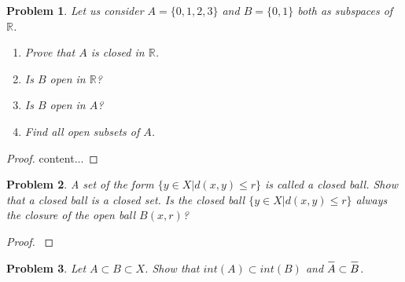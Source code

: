 \documentclass[paper=a4, fontsize=11pt]{scrartcl}
\newcommand{\overbar}[1]{
	\mkern 1.5mu \overline{\mkern-1.5mu\raisebox{0pt}[\dimexpr\height+0.5mm\relax]{$#1$}\mkern-1.5mu}\mkern 1.5mu
}
\newtheorem{problem}{Problem}
\begin{document}
\begin{problem}
	Let us consider $A=\{0,1,2,3\}$ and $B=\{0,1\}$ both as subspaces of $\mathbb{R}$.
	\begin{enumerate}[label=(\alph*)]
		\item Prove that $A$ is closed in $\mathbb{R}$.
		\item Is $B$ open in $\mathbb{R}$?
		\item Is $B$ open in $A$?
		\item Find all open subsets of $A$.\\
	\end{enumerate}
\end{problem}

\begin{proof}
	content...
\end{proof}

\begin{problem}
	A set of the form $\{y \in X | d(x,y) \leq r \}$ is called a closed ball. Show that a closed ball is a closed set. Is the closed ball $\{ y \in X | d(x,y) \leq r \}$ always the closure of the open ball $B(x,r)$?\\
\end{problem}

\begin{proof}
	$ $ \newline
	\vspace{-0.15in}
\end{proof}

\begin{problem}
	Let $A \subset B \subset X$. Show that $int(A) \subset int(B)$ and $\overbar{A} \subset \overbar{B}$. \\
\end{problem}
\end{document}
